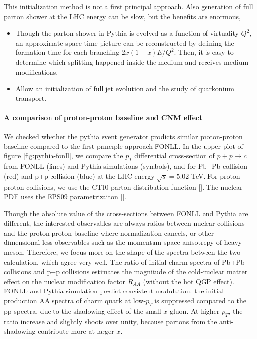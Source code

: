 This initialization method is not a first principal approach. Also generation of full parton shower at the LHC energy can be slow, but the benefits are enormous,
\begin{itemize}
\item Though the parton shower in Pythia is evolved as a function of virtuality $Q^2$,
an approximate space-time picture can be reconstructed by defining the formation time for each branching $2x(1-x)E/Q^2$. Then, it is easy to determine which splitting happened inside the medium and receives medium modifications.
\item Allow an initialization of full jet evolution and the study of quarkonium transport.
\end{itemize}

\paragraph{A comparison of proton-proton baseline and CNM effect}
We checked whether the pythia event generator prodicts similar proton-proton baseline compared to the first principle approach FONLL.
In the upper plot of figure \ref{fig:pythia-fonll}, we compare the $p_T$ differential cross-section of $p+p\rightarrow c$ from FONLL (lines) and Pythia simulations (symbols), and for Pb+Pb collision (red) and p+p collision (blue) at the LHC energy $\sqrt{s}=5.02$ TeV.
For proton-proton collisions, we use the CT10 parton distribution function [].
The nuclear PDF uses the EPS09 parametrizaiton [].

Though the absolute value of the cross-sections between FONLL and Pythia are different, the interested observables are always ratios between nuclear collisions and the proton-proton baseline where normalization cancels, or other dimensional-less observables such as the momentum-space anisotropy of heavy meson.
Therefore, we focus more on the shape of the spectra between the two calculation, which agree very well.
The ratio of initial charm spectra of Pb+Pb collisions and p+p collisions estimates the magnitude of the cold-nuclear matter effect on the nuclear modification factor $R_{AA}$ (without the hot QGP effect).
FONLL and Pythia simulation predict consistent modulation: the initial production AA spectra of charm quark at low-$p_T$ is suppressed compared to the pp spectra, due to the shadowing effect of the small-$x$ gluon. 
At higher $p_T$, the ratio increase and slightly shoots over unity, because partons from the anti-shadowing contribute more at larger-$x$.

